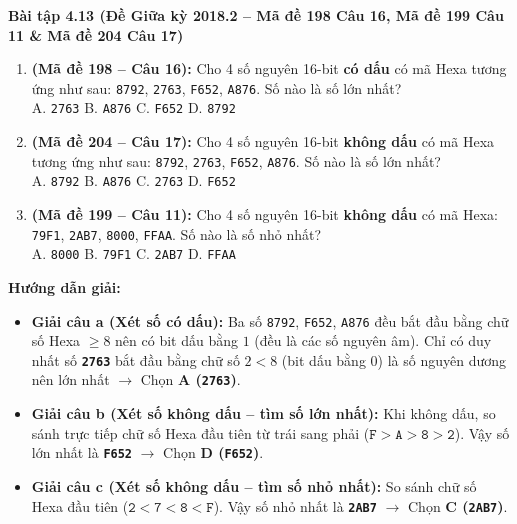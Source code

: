 \textbf{Bài tập 4.13 (Đề Giữa kỳ 2018.2 -- Mã đề 198 Câu 16, Mã đề 199 Câu 11 \& Mã đề 204 Câu 17)}
\begin{enumerate}[label=\alph*)]
    \item \textbf{(Mã đề 198 -- Câu 16):} Cho 4 số nguyên 16-bit \textbf{có dấu} có mã Hexa tương ứng như sau: \texttt{8792}, \texttt{2763}, \texttt{F652}, \texttt{A876}. Số nào là số lớn nhất?\\
    A. \texttt{2763} \qquad B. \texttt{A876} \qquad C. \texttt{F652} \qquad D. \texttt{8792}
    \item \textbf{(Mã đề 204 -- Câu 17):} Cho 4 số nguyên 16-bit \textbf{không dấu} có mã Hexa tương ứng như sau: \texttt{8792}, \texttt{2763}, \texttt{F652}, \texttt{A876}. Số nào là số lớn nhất?\\
    A. \texttt{8792} \qquad B. \texttt{A876} \qquad C. \texttt{2763} \qquad D. \texttt{F652}
    \item \textbf{(Mã đề 199 -- Câu 11):} Cho 4 số nguyên 16-bit \textbf{không dấu} có mã Hexa: \texttt{79F1}, \texttt{2AB7}, \texttt{8000}, \texttt{FFAA}. Số nào là số nhỏ nhất?\\
    A. \texttt{8000} \qquad B. \texttt{79F1} \qquad C. \texttt{2AB7} \qquad D. \texttt{FFAA}
\end{enumerate}
\textbf{Hướng dẫn giải:}
\begin{itemize}
    \item \textbf{Giải câu a (Xét số có dấu):} Ba số \texttt{8792}, \texttt{F652}, \texttt{A876} đều bắt đầu bằng chữ số Hexa $\ge 8$ nên có bit dấu bằng $1$ (đều là các số nguyên âm). Chỉ có duy nhất số \textbf{\texttt{2763}} bắt đầu bằng chữ số $2 < 8$ (bit dấu bằng $0$) là số nguyên dương nên lớn nhất $\rightarrow$ Chọn \textbf{A (\texttt{2763})}.
    \item \textbf{Giải câu b (Xét số không dấu -- tìm số lớn nhất):} Khi không dấu, so sánh trực tiếp chữ số Hexa đầu tiên từ trái sang phải ($\texttt{F} > \texttt{A} > \texttt{8} > \texttt{2}$). Vậy số lớn nhất là \textbf{\texttt{F652}} $\rightarrow$ Chọn \textbf{D (\texttt{F652})}.
    \item \textbf{Giải câu c (Xét số không dấu -- tìm số nhỏ nhất):} So sánh chữ số Hexa đầu tiên ($\texttt{2} < \texttt{7} < \texttt{8} < \texttt{F}$). Vậy số nhỏ nhất là \textbf{\texttt{2AB7}} $\rightarrow$ Chọn \textbf{C (\texttt{2AB7})}.
\end{itemize}

